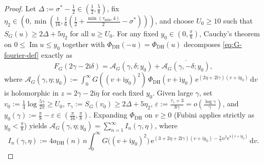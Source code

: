 \documentclass[11pt,a4paper,reqno]{amsart}
\theoremstyle{definition}
\theoremstyle{remark}
\numberwithin{equation}{section}
\newcommand{\dd}{\mathrm{d}}
\newcommand{\ii}{\mathrm{i}}
\newcommand{\ee}{\mathrm{e}}
\DeclareMathOperator{\Imop}{Im}
\begin{document}
\begin{proof}
Let $\Delta := \sigma^* - \frac{1}{2} \in (\frac{1}{2}, \frac{5}{8})$, fix $\eta_2 \in (0, \min(\frac{1}{16}, \frac{1}{6}(\frac{1}{2} + \frac{\min(\tau_{\min}, 4)}{2} - \sigma^*)))$, and choose $U_0 \ge 10$ such that $S_G(u) \ge 2\Delta + 5\eta_2$ for all $u \ge U_0$. For any fixed $y_0 \in (0, \frac{\pi}{8})$, Cauchy's theorem on $0 \le \Imop u \le y_0$ together with $\Phi_{\mathrm{DH}}(-u) = \Phi_{\mathrm{DH}}(u)$ decomposes \eqref{eq:G-fourier-def} exactly as
\begin{equation}
  F_G(2\gamma - 2\ii\delta)
  = \mathcal{A}_G(\gamma, \delta; y_0) + \overline{\mathcal{A}_G(\gamma, -\delta; y_0)},
  \label{eq:FG-u-split}
\end{equation}
where $\mathcal{A}_G(\gamma, \eta; y_0) := \int_{0}^{\infty} G((v + \ii y_0)^2)\,\Phi_{\mathrm{DH}}(v + \ii y_0)\,\ee^{(2\eta + 2\ii\gamma)(v + \ii y_0)}\,\dd v$ is holomorphic in $z = 2\gamma - 2\ii\eta$ for each fixed $y_0$. Given large $\gamma$, set $v_0 := \frac{1}{4}\log\frac{5\gamma}{2\pi} \ge U_0$, $\tau_\gamma := S_G(v_0) \ge 2\Delta + 5\eta_2$, $\varepsilon := \frac{\tau_\gamma + 3}{8\gamma} = o(\frac{\log\gamma}{\gamma})$, and $y_0(\gamma) := \frac{\pi}{8} - \varepsilon \in (\frac{\pi}{16}, \frac{\pi}{8})$. Expanding $\Phi_{\mathrm{DH}}$ on $v \ge 0$ (Fubini applies strictly as $y_0 < \frac{\pi}{8}$) yields $\mathcal{A}_G(\gamma, \eta; y_0) = \sum_{n=1}^{\infty} I_n(\gamma, \eta)$, where
\begin{equation*}
  I_n(\gamma, \eta)
  := 4a_{\mathrm{DH}}(n)\,n\int_{0}^{\infty} G\bigl((v + \ii y_0)^2\bigr)\,\ee^{(3 + 2\eta + 2\ii\gamma)(v + \ii y_0) - \frac{\pi}{5}n^2\ee^{4(v + \ii y_0)}}\,\dd v.
\end{equation*}

\end{proof}
\end{document}
